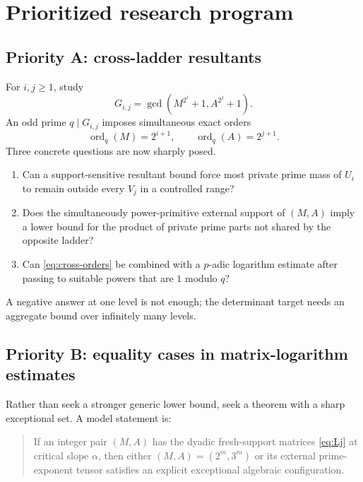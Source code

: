 \documentclass[11pt]{article}
\theoremstyle{definition}
\newcommand{\ord}{\operatorname{ord}}
\begin{document}
\section{Prioritized research program}\label{sec:program}

\subsection{Priority A: cross-ladder resultants}

For $i,j\ge1$, study
\begin{equation}\label{eq:cross-gcd}
 G_{i,j}=\gcd(M^{2^i}+1,A^{2^j}+1).
\end{equation}
An odd prime $q\mid G_{i,j}$ imposes simultaneous exact orders
\begin{equation}\label{eq:cross-orders}
 \ord_q(M)=2^{i+1},
 \qquad
 \ord_q(A)=2^{j+1}.
\end{equation}
Three concrete questions are now sharply posed.

\begin{enumerate}
\item Can a support-sensitive resultant bound force most private prime mass of $U_i$ to
remain outside every $V_j$ in a controlled range?
\item Does the simultaneously power-primitive external support of $(M,A)$ imply a lower bound for the product of
private prime parts not shared by the opposite ladder?
\item Can \eqref{eq:cross-orders} be combined with a $p$-adic logarithm estimate after
passing to suitable powers that are $1$ modulo $q$?
\end{enumerate}

A negative answer at one level is not enough; the determinant target needs an aggregate
bound over infinitely many levels.

\subsection{Priority B: equality cases in matrix-logarithm estimates}

Rather than seek a stronger generic lower bound, seek a theorem with a sharp exceptional
set.  A model statement is:

\begin{quote}
If an integer pair $(M,A)$ has the dyadic fresh-support matrices \eqref{eq:Lj} at critical
slope $\alpha$, then either $(M,A)=(2^m,3^m)$ or its external prime-exponent tensor satisfies
an explicit exceptional algebraic configuration.
\end{quote}
\end{document}
